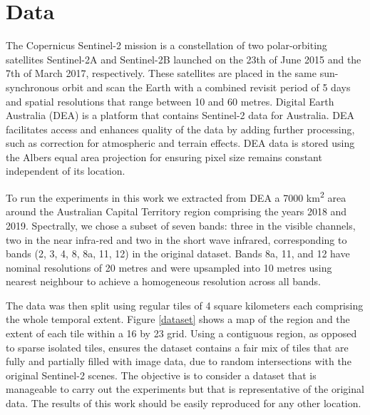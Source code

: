 \documentclass[essd, manuscript]{copernicus}
\begin{document}
\section{Data}

The Copernicus Sentinel-2 mission \citep{drusch2012sentinel} is a constellation of two polar-orbiting satellites Sentinel-2A and Sentinel-2B launched on the 23th of June 2015 and the 7th of March 2017, respectively. These satellites are placed in the same sun-synchronous orbit and scan the Earth with a combined revisit period of 5 days and spatial resolutions that range between 10 and 60 metres. Digital Earth Australia (DEA) \citep{dhu2017digital} is a platform that contains Sentinel-2 data for Australia. DEA facilitates access and enhances quality of the data by adding further processing, such as correction for atmospheric and terrain effects. DEA data is stored using the Albers equal area projection for ensuring pixel size remains constant independent of its location.

To run the experiments in this work we extracted from DEA a 7000 km\textsuperscript{2} area around the Australian Capital Territory region comprising the years 2018 and 2019. Spectrally, we chose a subset of seven bands: three in the visible channels, two in the near infra-red and two in the short wave infrared, corresponding to bands (2, 3, 4, 8, 8a, 11, 12) in the original dataset. Bands 8a, 11, and 12 have nominal resolutions of 20 metres and were upsampled into 10 metres using nearest neighbour to achieve a homogeneous resolution across all bands.

The data was then split using regular tiles of 4 square kilometers each comprising the whole temporal extent. Figure \ref{dataset} shows a map of the region and the extent of each tile within a 16 by 23 grid. Using a contiguous region, as opposed to sparse isolated tiles, ensures the dataset contains a fair mix of tiles that are fully and partially filled with image data, due to random intersections with the original Sentinel-2 scenes. The objective is to consider a dataset that is manageable to carry out the experiments but that is representative of the original data. The results of this work should be easily reproduced for any other location.
\end{document}
